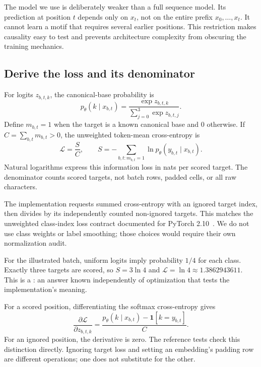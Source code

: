 The model we use is deliberately weaker than a full sequence model. Its prediction at position $t$ depends only on $x_t$, not on the entire prefix $x_0,\ldots,x_t$. It cannot learn a motif that requires several earlier positions. This restriction makes causality easy to test and prevents architecture complexity from obscuring the training mechanics.

\subsection{Derive the loss and its denominator}

For logits $z_{b,t,k}$, the canonical-base probability is
\begin{equation}
p_\theta(k\mid x_{b,t})=
\frac{\exp z_{b,t,k}}{\sum_{j=0}^{3}\exp z_{b,t,j}}.
\end{equation}
Define $m_{b,t}=1$ when the target is a known canonical base and 0 otherwise. If $C=\sum_{b,t}m_{b,t}>0$, the unweighted token-mean cross-entropy is
\begin{equation}
\mathcal L=\frac{S}{C},\qquad
S=-\sum_{b,t:m_{b,t}=1}\ln p_\theta(y_{b,t}\mid x_{b,t}).
\label{eq:loss}
\end{equation}
Natural logarithms express this information loss in nats per scored target. The denominator counts scored targets, not batch rows, padded cells, or all raw characters.

The implementation requests summed cross-entropy with an ignored target index, then divides by its independently counted non-ignored targets. This matches the unweighted class-index loss contract documented for PyTorch 2.10~\cite{ce}. We do not use class weights or label smoothing; those choices would require their own normalization audit.

For the illustrated batch, uniform logits imply probability $1/4$ for each class. Exactly three targets are scored, so $S=3\ln4$ and $\mathcal L=\ln4\approx1.3862943611$. This is a : an answer known independently of optimization that tests the implementation's meaning.

For a scored position, differentiating the softmax cross-entropy gives
\begin{equation}
\frac{\partial\mathcal L}{\partial z_{b,t,k}}
=\frac{p_\theta(k\mid x_{b,t})-\mathbf1[k=y_{b,t}]}{C}.
\label{eq:grad}
\end{equation}
For an ignored position, the derivative is zero. The reference tests check this distinction directly. Ignoring target loss and setting an embedding's padding row are different operations; one does not substitute for the other.

